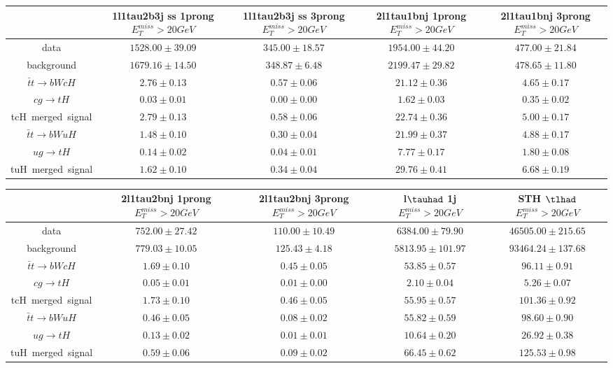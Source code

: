 \begin{tabular}{|c|c|c|c|c|} \hline
 & 1l1tau2b3j ss 1prong  $E_T^{miss}>20GeV$ & 1l1tau2b3j ss 3prong  $E_T^{miss}>20GeV$ & 2l1tau1bnj 1prong  $E_T^{miss}>20GeV$ & 2l1tau1bnj 3prong  $E_T^{miss}>20GeV$\\\hline
data & $1528.00\pm39.09$ & $345.00\pm18.57$ & $1954.00\pm44.20$ & $477.00\pm21.84$\\\hline
background & $1679.16\pm14.50$ & $348.87\pm6.48$ & $2199.47\pm29.82$ & $478.65\pm11.80$\\\hline
$\bar{t}t\to bWcH$ & $2.76\pm0.13$ & $0.57\pm0.06$ & $21.12\pm0.36$ & $4.65\pm0.17$\\\hline
$cg\to tH$ & $0.03\pm0.01$ & $0.00\pm0.00$ & $1.62\pm0.03$ & $0.35\pm0.02$\\\hline
tcH~merged~signal & $2.79\pm0.13$ & $0.58\pm0.06$ & $22.74\pm0.36$ & $5.00\pm0.17$\\\hline
$\bar{t}t\to bWuH$ & $1.48\pm0.10$ & $0.30\pm0.04$ & $21.99\pm0.37$ & $4.88\pm0.17$\\\hline
$ug\to tH$ & $0.14\pm0.02$ & $0.04\pm0.01$ & $7.77\pm0.17$ & $1.80\pm0.08$\\\hline
tuH~merged~signal & $1.62\pm0.10$ & $0.34\pm0.04$ & $29.76\pm0.41$ & $6.68\pm0.19$\\\hline
\end{tabular}
\begin{tabular}{|c|c|c|c|c|} \hline
 & 2l1tau2bnj 1prong  $E_T^{miss}>20GeV$ & 2l1tau2bnj 3prong  $E_T^{miss}>20GeV$ & l$\tauhad$ 1j  $E_T^{miss}>20GeV$ & STH $\tlhad$   $E_T^{miss}>20GeV$\\\hline
data & $752.00\pm27.42$ & $110.00\pm10.49$ & $6384.00\pm79.90$ & $46505.00\pm215.65$\\\hline
background & $779.03\pm10.05$ & $125.43\pm4.18$ & $5813.95\pm101.97$ & $93464.24\pm137.68$\\\hline
$\bar{t}t\to bWcH$ & $1.69\pm0.10$ & $0.45\pm0.05$ & $53.85\pm0.57$ & $96.11\pm0.91$\\\hline
$cg\to tH$ & $0.05\pm0.01$ & $0.01\pm0.00$ & $2.10\pm0.04$ & $5.26\pm0.07$\\\hline
tcH~merged~signal & $1.73\pm0.10$ & $0.46\pm0.05$ & $55.95\pm0.57$ & $101.36\pm0.92$\\\hline
$\bar{t}t\to bWuH$ & $0.46\pm0.05$ & $0.08\pm0.02$ & $55.82\pm0.59$ & $98.60\pm0.90$\\\hline
$ug\to tH$ & $0.13\pm0.02$ & $0.01\pm0.01$ & $10.64\pm0.20$ & $26.92\pm0.38$\\\hline
tuH~merged~signal & $0.59\pm0.06$ & $0.09\pm0.02$ & $66.45\pm0.62$ & $125.53\pm0.98$\\\hline
\end{tabular}

